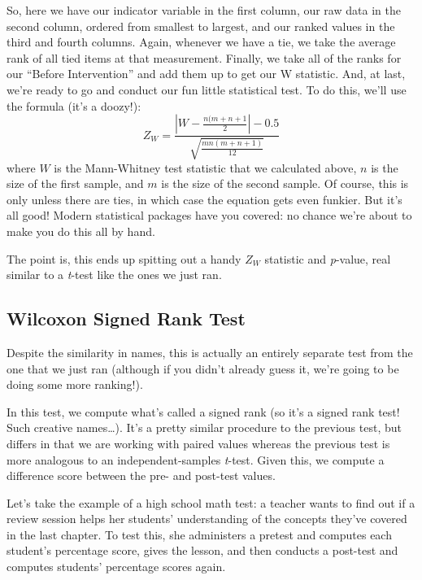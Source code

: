 So, here we have our indicator variable in the first column, our raw data in the second column, ordered from smallest to largest, and our ranked values in the third and fourth columns. Again, whenever we have a tie, we take the average rank of all tied items at that measurement. Finally, we take all of the ranks for our ``Before Intervention'' and add them up to get our W statistic.
\clearpage
And, at last, we're ready to go and conduct our fun little statistical test. To do this, we'll use the formula (it's a doozy!):
\begin{equation}
Z_W = \frac{\left|W-\frac{n(m+n+1}{2}\right|-0.5}{\sqrt{\frac{mn(m+n+1)}{12}}}
\end{equation}
where $W$ is the Mann-Whitney test statistic that we calculated above, $n$ is the size of the first sample, and $m$ is the size of the second sample. Of course, this is only unless there are ties, in which case the equation gets even funkier. But it's all good! Modern statistical packages have you covered: no chance we're about to make you do this all by hand.

The point is, this ends up spitting out a handy $Z_W$ statistic and \textit{p}-value, real similar to a \textit{t}-test like the ones we just ran.

\subsection{Wilcoxon Signed Rank Test}

Despite the similarity in names, this is actually an entirely separate test from the one that we just ran (although if you didn't already guess it, we're going to be doing some more ranking!).

In this test, we compute what's called a signed rank (so it's a signed rank test! Such creative names\ldots). It's a pretty similar procedure to the previous test, but differs in that we are working with paired values whereas the previous test is more analogous to an independent-samples \textit{t}-test. Given this, we compute a difference score between the pre- and post-test values.

Let's take the example of a high school math test: a teacher wants to find out if a review session helps her students' understanding of the concepts they've covered in the last chapter. To test this, she administers a pretest and computes each student's percentage score, gives the lesson, and then conducts a post-test and computes students' percentage scores again.

